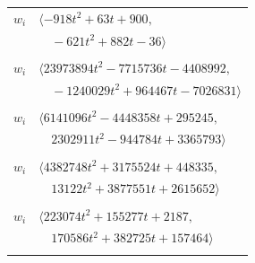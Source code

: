 \documentclass[11pt]{article}
\begin{document}
\begin{longtable}{@{}ll@{}}
$w_i$ & $\langle -918t^{2}+63t+900,$\\
 & $\quad -621t^{2}+882t-36\rangle$\\
\addlinespace[2pt]
\multicolumn{2}{@{}p{0.97\textwidth}@{}}{$i=13$, $D_i=324$, $e_i=1$, $\rho_{ij}$: $2{:}2, \allowbreak 4{:}1, \allowbreak 6{:}1, \allowbreak 18{:}2, \allowbreak 20{:}1, \allowbreak 21{:}2, \allowbreak 26{:}1, \allowbreak 29{:}2, \allowbreak 44{:}1, \allowbreak 46{:}1, \allowbreak 53{:}2, \allowbreak 58{:}1, \allowbreak 59{:}1, \allowbreak 61{:}1, \allowbreak 65{:}1, \allowbreak 72{:}1, \allowbreak 74{:}1$}\\
$w_i$ & $\langle 23973894t^{2}-7715736t-4408992,$\\
 & $\quad -1240029t^{2}+964467t-7026831\rangle$\\
\addlinespace[2pt]
\multicolumn{2}{@{}p{0.97\textwidth}@{}}{$i=14$, $D_i=324$, $e_i=2$, $\rho_{ij}$: $1{:}1, \allowbreak 2{:}1, \allowbreak 18{:}1, \allowbreak 19{:}1, \allowbreak 20{:}1, \allowbreak 23{:}2, \allowbreak 42{:}1, \allowbreak 44{:}2, \allowbreak 46{:}1, \allowbreak 51{:}2, \allowbreak 54{:}2, \allowbreak 63{:}2, \allowbreak 69{:}2, \allowbreak 74{:}1$}\\
$w_i$ & $\langle 6141096t^{2}-4448358t+295245,$\\
 & $\quad 2302911t^{2}-944784t+3365793\rangle$\\
\addlinespace[2pt]
\multicolumn{2}{@{}p{0.97\textwidth}@{}}{$i=15$, $D_i=648$, $e_i=0$, $\rho_{ij}$: $1{:}1, \allowbreak 2{:}2, \allowbreak 5{:}2, \allowbreak 18{:}1, \allowbreak 30{:}2, \allowbreak 33{:}2, \allowbreak 42{:}1, \allowbreak 45{:}1, \allowbreak 46{:}1, \allowbreak 49{:}2, \allowbreak 51{:}2, \allowbreak 64{:}2, \allowbreak 65{:}1, \allowbreak 73{:}1$}\\
$w_i$ & $\langle 4382748t^{2}+3175524t+448335,$\\
 & $\quad 13122t^{2}+3877551t+2615652\rangle$\\
\addlinespace[2pt]
\multicolumn{2}{@{}p{0.97\textwidth}@{}}{$i=16$, $D_i=324$, $e_i=1$, $\rho_{ij}$: $1{:}2, \allowbreak 2{:}2, \allowbreak 18{:}1, \allowbreak 26{:}2, \allowbreak 28{:}2, \allowbreak 35{:}1, \allowbreak 49{:}2, \allowbreak 53{:}2, \allowbreak 64{:}1, \allowbreak 65{:}2$}\\
$w_i$ & $\langle 223074t^{2}+155277t+2187,$\\
 & $\quad 170586t^{2}+382725t+157464\rangle$\\
\addlinespace[2pt]
\multicolumn{2}{@{}p{0.97\textwidth}@{}}{$i=17$, $D_i=3$, $\rho_{ij}$: $20{:}1, \allowbreak 21{:}1, \allowbreak 29{:}1, \allowbreak 32{:}2, \allowbreak 40{:}1, \allowbreak 43{:}1, \allowbreak 46{:}2, \allowbreak 62{:}2, \allowbreak 74{:}1$}\\

\end{longtable}
\end{document}
